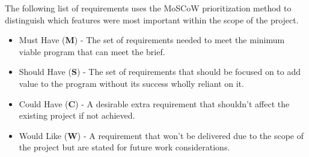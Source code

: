 \documentclass{l4proj}
\begin{document}
The following list of requirements uses the MoSCoW prioritization method to distinguish which features were most important within the scope of the project. 
\begin{itemize}
    \item Must Have (\textbf{M}) - The set of requirements needed to meet the minimum viable program that can meet the brief.
    \item Should Have (\textbf{S}) - The set of requirements that should be focused on to add value to the program without its success wholly reliant on it.
    \item Could Have (\textbf{C}) - A desirable extra requirement that shouldn't affect the existing project if not achieved.
    \item Would Like (\textbf{W}) - A requirement that won't be delivered due to the scope of the project but are stated for future work considerations.
\end{itemize}
\end{document}
